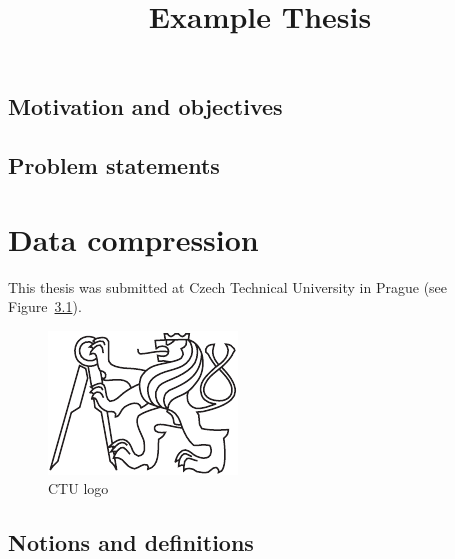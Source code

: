 \documentclass[thesis=M,english]{FITthesis}[2012/10/20]
\title{Example Thesis}
\begin{document}

\begin{introduction}
	\section{Motivation and objectives}

	\section{Problem statements}

\end{introduction}

\chapter{Data compression}\label{textcompr}

	This thesis was submitted at Czech Technical University in Prague (see Figure~\ref{fig:logo}).

	\begin{figure}\centering
		\includegraphics{cvut-logo-bw}
		\caption{CTU logo}\label{fig:logo}
	\end{figure}

\section{Notions and definitions}
\end{document}
